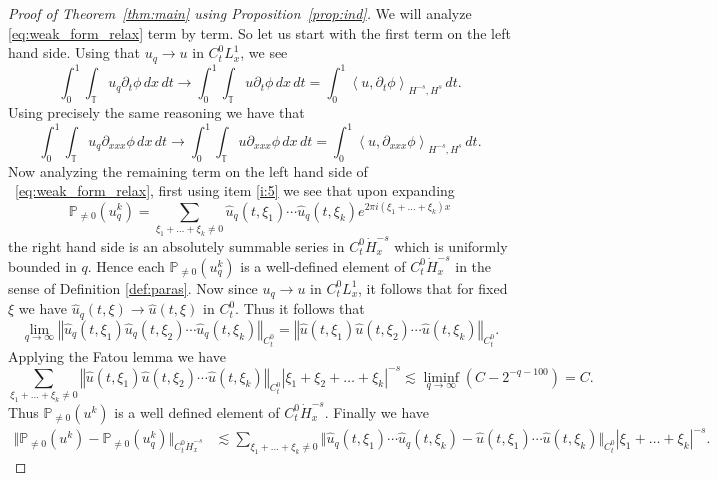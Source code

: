 \documentclass[12pt,reqno,letterpaper]{amsart}
\numberwithin{equation}{section}
\newcommand{\1}{{\bf 1}}
\newcommand{\2}{{\bf 2}}
\newcommand{\T}{\mathbb T}
\theoremstyle{remark}
\theoremstyle{remark}
\begin{document}
\begin{proof}[Proof of Theorem~\ref{thm:main} using Proposition~\ref{prop:ind}]
We will analyze \eqref{eq:weak_form_relax} term by term. So let us start with the first term on the left hand side. Using that $u_q \to u$ in $C_t^0L^1_x$, we see
\begin{equation}\label{eq:time_deriv_term_conv}
    \int_0^1 \int_{\T} u_q \partial_t\phi\, dx\, dt \to \int_0^1 \int_{\T} u \partial_t\phi\, dx\, dt = \int_0^1 \left\langle u,\partial_t\phi \right\rangle_{H^{-s},H^s}\, dt.
\end{equation}
Using precisely the same reasoning we have that
\begin{equation}\label{eq:triple_deriv_term_conv}
    \int_0^1 \int_{\T} u_q \partial_{xxx}\phi\, dx\, dt \to \int_0^1 \int_{\T} u \partial_{xxx}\phi\, dx\, dt = \int_0^1 \left\langle u,\partial_{xxx}\phi \right\rangle_{H^{-s},H^s}\, dt.
\end{equation}
Now analyzing the remaining term on the left hand side of ~\eqref{eq:weak_form_relax}, first using item \ref{i:5} we see that upon expanding
$$
\mathbb{P}_{\not=0}(u_q^k) = \sum_{\xi_1 + \ldots + \xi_k \not=0} \hat{u}_q(t,\xi_1) \cdots \hat{u}_q(t,\xi_k) e^{2\pi i (\xi_1 + \ldots + \xi_k)x}
$$
the right hand side is an absolutely summable series in $C_t^0 \dot{H}_x^{-s}$ which is uniformly bounded in $q$. Hence each $\mathbb{P}_{\not=0}(u_q^k)$ is a well-defined element of $C_t^0 \dot{H}_x^{-s}$ in the sense of Definition \ref{def:paras}. Now since $u_q \to u$ in $C_t^0 L_x^1$, it follows that for fixed $\xi$ we have $\hat{u}_q(t,\xi) \to \hat{u}(t,\xi)$ in $C_{t}^0$. Thus it follows that
$$
\lim_{q \to \infty} \left\Vert \hat{u}_q(t,\xi_1) \hat{u}_q(t,\xi_2) \cdots \hat{u}_q(t,\xi_k)\right\Vert_{C^0_t} = \left\Vert \hat{u}(t,\xi_1) \hat{u}(t,\xi_2) \cdots \hat{u}(t,\xi_k)\right\Vert_{C^0_t}.
$$
Applying the Fatou lemma we have
$$
\sum_{\xi_1 + \ldots + \xi_k \not = 0} \left\Vert \hat{u}(t,\xi_1) \hat{u}(t,\xi_2) \cdots \hat{u}(t,\xi_k)\right\Vert_{C^0_t} |\xi_1 + \xi_2 + \ldots +\xi_k|^{-s} \lesssim \liminf_{q \to \infty}\left(C - 2^{-q-100}\right) = C.
$$
Thus $\mathbb{P}_{\not=0}(u^k)$ is a well defined element of $C_t^0\dot{H}^{-s}_x$. Finally we have
\begin{equation*}
    \begin{split}
        \Vert \mathbb{P}_{\not=0}(u^k) - \mathbb{P}_{\not=0}(u_q^k) \Vert_{C_t^0 \dot{H}_x^{-s}} &\lesssim \sum_{\xi_1 + \ldots + \xi_k \not=0} \Vert \hat{u}_q(t,\xi_1) \cdots \hat{u}_q(t,\xi_k) - \hat{u}(t,\xi_1)\cdots \hat{u}(t,\xi_k)\Vert_{C^0_t} |\xi_1 + \ldots + \xi_k|^{-s}.
    \end{split}
\end{equation*}

\end{proof}
\end{document}
